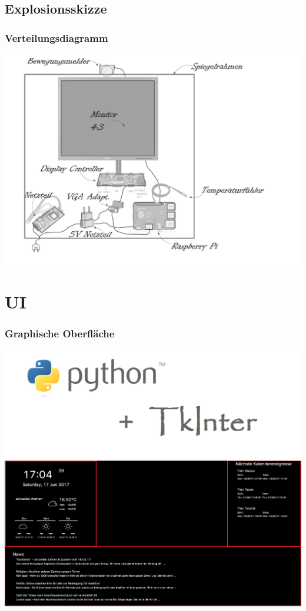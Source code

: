 \documentclass[11pt]{beamer}
\begin{document}
	\subsection{Explosionsskizze}
	\begin{frame}
		\frametitle{Verteilungsdiagramm}
		\includegraphics[scale = 0.4]{images/smartMirrorExplosionsskizze.pdf}
	\end{frame}

	\section{UI}
	\begin{frame}
		\frametitle{Graphische Oberfl\"ache}
		\begin{center}
			\includegraphics[scale=0.3]{images/python+tkinter.png}
			\linebreak
			\includegraphics[scale=0.2]{images/grafOberflaeche.png}
		\end{center}
	\end{frame}
		
\end{document}
